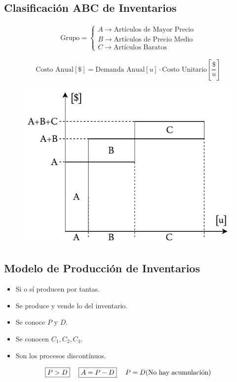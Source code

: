 \documentclass[10pt,letterpaper]{article}
\begin{document}
\subsection{Clasificación ABC de Inventarios}
\noindent
\begin{minipage}[t]{.5\textwidth}
\raggedright
\begin{align*}
\text{Grupo}=
\begin{cases}
A \rightarrow \text{Artículos de Mayor Precio} \\
B \rightarrow \text{Artículos de Precio Medio} \\
C \rightarrow \text{Artículos Baratos}
\end{cases}
\end{align*}
\end{minipage}%
\begin{minipage}[t]{.5\textwidth}
\raggedright
$$
\text{Costo Anual}[\$] = \text{Demanda Anual}[u]\cdot \text{Costo Unitario}\left[ \frac{\$}{u}\right]
$$
\end{minipage}
\begin{figure}[H]
\centering
\includegraphics[scale=0.8]{ABC.pdf}
\end{figure}
\subsection{Modelo de Producción de Inventarios}
\begin{itemize}
\item Si o sí producen por tantas.
\item Se produce y vende lo del inventario.
\item Se conoce $P$ y $D$.
\item Se conocen $C_1,C_2,C_3$.
\item Son los procesos discontínuos.
\end{itemize}
\begin{align*}
\boxed{P > D} &\hspace{0.1cm} & \boxed{A=P-D} & \hspace{0.1cm} & P=D (\text{No hay acumulación)}
\end{align*}
\end{document}

